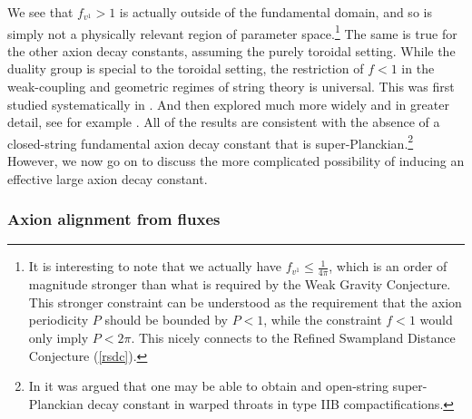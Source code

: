 \documentclass[11pt,a4paper]{article}
\numberwithin{equation}{section}
\numberwithin{table}{section}\setlength{\multlinegap}{25pt}
\begin{document}
We see that $f_{v^1} > 1$ is actually outside of the fundamental domain, and so is simply not a physically relevant region of parameter space.\footnote{It is interesting to note that we actually have $f_{v^1} \leq \frac{1}{4\pi}$, which is an order of magnitude stronger than what is required by the Weak Gravity Conjecture. This stronger constraint can be understood as the requirement that the axion periodicity $P$ should be bounded by $P < 1$, while the constraint $f < 1$ would only imply $P < 2 \pi$. This nicely connects to the Refined Swampland Distance Conjecture (\ref{rsdc}).} The same is true for the other axion decay constants, assuming the purely toroidal setting. While the duality group is special to the toroidal setting, the restriction of $f < 1$ in the weak-coupling and geometric regimes of string theory is universal. This was first studied systematically in \cite{Banks:2003sx}. And then explored much more widely and in greater detail, see for example \cite{Svrcek:2006yi,Ben-Dayan:2014lca,Bachlechner:2014hsa,Long:2014dta,Long:2014fba,Bachlechner:2014gfa,Rudelius:2015xta,Montero:2015ofa,Bachlechner:2015qja,Shiu:2015uva,Ruehle:2015afa,Hebecker:2015rya,Brown:2015lia,Retolaza:2015sta,Peloso:2015dsa,Junghans:2015hba,Heidenreich:2015wga,Palti:2015xra,Bachlechner:2015cgq, Heidenreich:2015nta,Kooner:2015rza,Kappl:2015esy,Furuuchi:2015jfj,Choi:2015aem,Ibanez:2015fcv,Hebecker:2015zss,Conlon:2016aea,Retolaza:2016bpn,Heidenreich:2016jrl,Blumenhagen:2016bfp,Garcia-Valdecasas:2016voz,Heidenreich:2016aqi,Hebecker:2016dsw,Hebecker:2017wsu,Hebecker:2017uix,Montero:2017yja,Bachlechner:2017zpb,Bachlechner:2017hsj,Blumenhagen:2018hsh,Agrawal:2018mkd,Shiu:2018wzf,Hebecker:2018ofv,Hertog:2018kbz,Hebecker:2018yxs}. All of the results are consistent with the absence of a closed-string fundamental axion decay constant that is super-Planckian.\footnote{In \cite{Kooner:2015rza} it was argued that one may be able to obtain and open-string super-Planckian decay constant in warped throats in type IIB compactifications.} However, we now go on to discuss the more complicated possibility of inducing an effective large axion decay constant.  

\subsubsection*{Axion alignment from fluxes}
\end{document}
